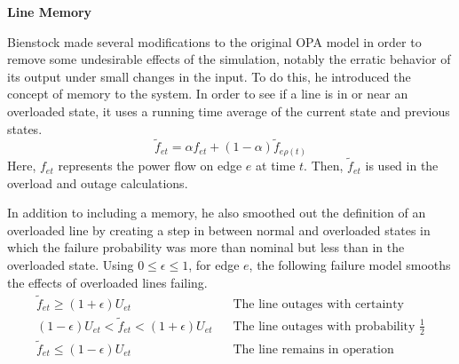 \textbf{Line Memory}

Bienstock made several modifications \cite{bienstock_2011} to the original OPA model in order to remove some undesirable effects of the simulation, notably the erratic behavior of its output under small changes in the input.  To do this, he introduced the concept of memory to the system.  In order to see if a line is in or near an overloaded state, it uses a running time average of the current state and previous states.
\begin{equation}
\tilde{f}_{et} = \alpha f_{et} + (1-\alpha) \tilde{f}_{e\rho(t)}
\end{equation} 
Here, $f_{et}$ represents the power flow on edge $e$ at time $t$.  Then, $\tilde{f}_{et}$ is used in the overload and outage calculations.

In addition to including a memory, he also smoothed out the definition of an overloaded line by creating a step in between normal and overloaded states in which the failure probability was more than nominal but less than in the overloaded state.  Using $0 \le \epsilon \le 1$, for edge $e$, the following failure model smooths the effects of overloaded lines failing.
\begin{align}
\tilde{f}_{et} \ge (1+\epsilon) U_{et}			&	\hspace{10pt} \mbox{The line outages with certainty} 	\\
(1-\epsilon) U_{et} < \tilde{f}_{et} < (1+\epsilon) U_{et}	&	\hspace{10pt} \mbox{The line outages with probability }\frac{1}{2} 	\\
\tilde{f}_{et} \le (1-\epsilon) U_{et}			&	\hspace{10pt} \mbox{The line remains in operation} 
\end{align}
